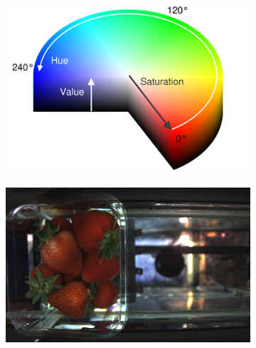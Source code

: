 \documentclass[fleqn,twoside,12pt]{report}
\begin{document}
\begin{figure}[ht]
	\centering
	\begin{subfigure}{.4\textwidth}
		\centering
		\includegraphics[width=.9\linewidth]{hue_sat.png}
		\caption{}
		\label{fig:hue_sat}
	\end{subfigure}%
	\begin{subfigure}{.4\textwidth}
		\centering
		\includegraphics[width=.9\linewidth]{bg_example.png}
		\caption{}
		\label{fig:bg_example}
	\end{subfigure}%
	

\end{figure}
\end{document}
